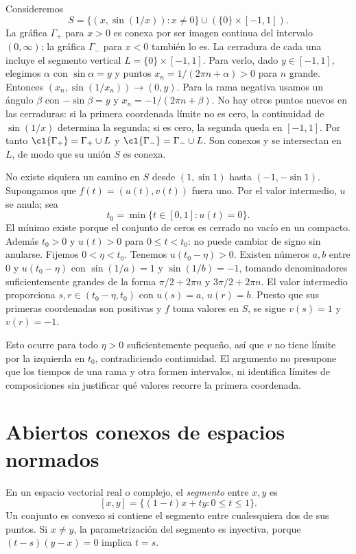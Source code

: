 \begin{ejemplo}\label{ch18:seno}
Consideremos
\[
S=\{(x,\sin(1/x)):x\ne0\}\cup(\{0\}\times[-1,1]).
\]
La gráfica $\Gamma_+$ para $x>0$ es conexa por ser imagen continua del intervalo $(0,\infty)$; la gráfica $\Gamma_-$ para $x<0$ también lo es. La cerradura de cada una incluye el segmento vertical $L=\{0\}\times[-1,1]$. Para verlo, dado $y\in[-1,1]$, elegimos $\alpha$ con $\sin\alpha=y$ y puntos $x_n=1/(2\pi n+\alpha)>0$ para $n$ grande. Entonces $(x_n,\sin(1/x_n))\to(0,y)$. Para la rama negativa usamos un ángulo $\beta$ con $-\sin\beta=y$ y $x_n=-1/(2\pi n+\beta)$. No hay otros puntos nuevos en las cerraduras: si la primera coordenada límite no es cero, la continuidad de $\sin(1/x)$ determina la segunda; si es cero, la segunda queda en $[-1,1]$. Por tanto $\cl{\Gamma_+}=\Gamma_+\cup L$ y $\cl{\Gamma_-}=\Gamma_-\cup L$. Son conexos y se intersectan en $L$, de modo que su unión $S$ es conexa.

No existe siquiera un camino en $S$ desde $(1,\sin1)$ hasta $(-1,-\sin1)$. Supongamos que $f(t)=(u(t),v(t))$ fuera uno. Por el valor intermedio, $u$ se anula; sea
\[
t_0=\min\{t\in[0,1]:u(t)=0\}.
\]
El mínimo existe porque el conjunto de ceros es cerrado no vacío en un compacto. Además $t_0>0$ y $u(t)>0$ para $0\le t<t_0$: no puede cambiar de signo sin anularse. Fijemos $0<\eta<t_0$. Tenemos $u(t_0-\eta)>0$. Existen números $a,b$ entre $0$ y $u(t_0-\eta)$ con $\sin(1/a)=1$ y $\sin(1/b)=-1$, tomando denominadores suficientemente grandes de la forma $\pi/2+2\pi n$ y $3\pi/2+2\pi n$. El valor intermedio proporciona $s,r\in(t_0-\eta,t_0)$ con $u(s)=a$, $u(r)=b$. Puesto que sus primeras coordenadas son positivas y $f$ toma valores en $S$, se sigue $v(s)=1$ y $v(r)=-1$.

Esto ocurre para todo $\eta>0$ suficientemente pequeño, así que $v$ no tiene límite por la izquierda en $t_0$, contradiciendo continuidad. El argumento no presupone que los tiempos de una rama y otra formen intervalos, ni identifica límites de composiciones sin justificar qué valores recorre la primera coordenada.
\end{ejemplo}

\section{Abiertos conexos de espacios normados}
\begin{definicion}
En un espacio vectorial real o complejo, el \emph{segmento} entre $x,y$ es
\[
[x,y]=\{(1-t)x+ty:0\le t\le1\}.
\]
Un conjunto es convexo si contiene el segmento entre cualesquiera dos de sus puntos. Si $x\ne y$, la parametrización del segmento es inyectiva, porque $(t-s)(y-x)=0$ implica $t=s$.
\end{definicion}

